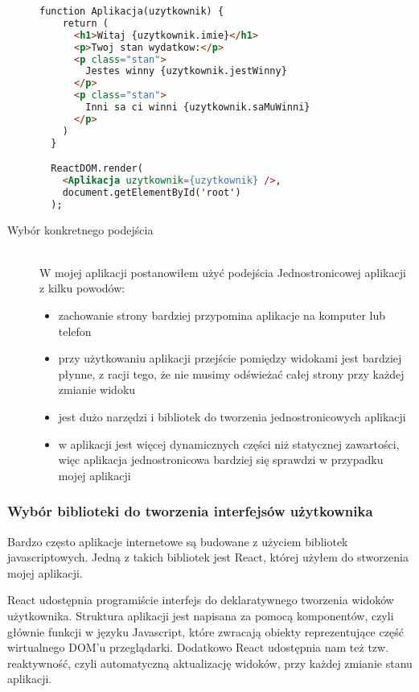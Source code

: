 \begin{description}
  \begin{lstlisting}[language=HTML, caption=Przykład aplikacji z użyciem biblioteki Javascriptowej, label={lst:reactCode}]
  function Aplikacja(uzytkownik) {
    return (
      <h1>Witaj {uzytkownik.imie}</h1>
      <p>Twoj stan wydatkow:</p>
      <p class="stan">
        Jestes winny {uzytkownik.jestWinny}
      </p>
      <p class="stan">
        Inni sa ci winni {uzytkownik.saMuWinni}
      </p>
    )
  }

  ReactDOM.render(
    <Aplikacja uzytkownik={uzytkownik} />,
    document.getElementById('root')
  );
  \end{lstlisting}
  \item[Wybór konkretnego podejścia] \hfill \\ W mojej aplikacji postanowiłem użyć podejścia Jednostronicowej aplikacji z kilku powodów:
  \begin{itemize}
    \item zachowanie strony bardziej przypomina aplikacje na komputer lub telefon
    \item przy użytkowaniu aplikacji przejście pomiędzy widokami jest bardziej płynne, z racji tego, że nie musimy odświeżać całej strony przy każdej zmianie widoku
    \item jest dużo narzędzi i bibliotek do tworzenia jednostronicowych aplikacji
    \item w aplikacji jest więcej dynamicznych części niż statycznej zawartości, więc aplikacja jednostronicowa bardziej się sprawdzi w przypadku mojej aplikacji
  \end{itemize}
\end{description}

\subsubsection{Wybór biblioteki do tworzenia interfejsów użytkownika}
Bardzo często aplikacje internetowe są budowane z użyciem bibliotek javascriptowych. Jedną z takich bibliotek jest React, której użyłem do stworzenia mojej aplikacji.

React udostępnia programiście interfejs do deklaratywnego tworzenia widoków użytkownika. Struktura aplikacji jest napisana za pomocą komponentów, czyli głównie funkcji w języku Javascript, które zwracają obiekty reprezentujące część wirtualnego DOM'u przeglądarki. Dodatkowo React udostępnia nam też tzw. reaktywność, czyli automatyczną aktualizację widoków, przy każdej zmianie stanu aplikacji.

